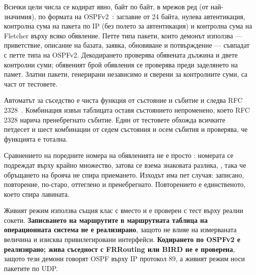 Всички цели числа се кодират явно, байт по байт, в мрежов ред (от най-значимия), по формата на
OSPFv2~\cite{rfc2328}: заглавие от 24 байта, нулева автентикация, контролна сума на пакета по
IP (без полето за автентикация) и контролна сума на Fletcher върху всяко обявление. Петте типа
пакети, които демонът използва — приветствие, описание на базата, заявка, обновяване и
потвърждение — съвпадат с петте типа на OSPFv2. Декодирането проверява обявената дължина и
двете контролни суми; обявеният брой обявления се проверява преди заделянето на памет. Златни
пакети, генерирани независимо и сверени за контролните суми, са част от тестовете.

Автоматът за съседство е чиста функция от състояние и събитие и следва RFC
2328~\cite{rfc2328}. Комбинация извън таблицата оставя състоянието непроменено, което RFC 2328
нарича пренебрегнато събитие. Един от тестовете обхожда всичките петдесет и шест комбинации от
седем състояния и осем събития и проверява, че функцията е тотална.

Сравнението на поредните номера на обявленията не е просто \code{>}: номерата се подреждат
върху крайно множество, затова се взема знаковата разлика, , така
че обръщането на брояча не спира приемането. Изходът има пет случая: записано, повторение,
по-старо, оттеглено и пренебрегнато. Повторението е единственото, което спира лавината.

Живият режим използва същия клас  с  вместо  и е
проверен с тест върху реални сокети. \textbf{Записването на маршрутите в маршрутната таблица на
операционната система не е реализирано}, защото не влияе на измерваната величина и изисква
привилегировани интерфейси. \textbf{Кодирането по OSPFv2 е реализирано; жива съседност с
FRRouting или BIRD не е проверена}, защото тези демони говорят OSPF върху IP протокол 89, а
живият режим носи пакетите по UDP.
